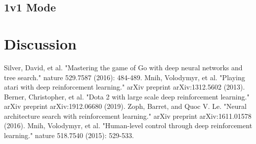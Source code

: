 \documentclass[14pt]{extarticle}
\begin{document}
\subsection{1v1 Mode}



\section{Discussion}




\begin{thebibliography}{99}
	Silver, David, et al. "Mastering the game of Go with deep neural networks and tree search." nature 529.7587 (2016): 484-489.
	Mnih, Volodymyr, et al. "Playing atari with deep reinforcement learning." arXiv preprint arXiv:1312.5602 (2013).
	Berner, Christopher, et al. "Dota 2 with large scale deep reinforcement learning." arXiv preprint arXiv:1912.06680 (2019).
    Zoph, Barret, and Quoc V. Le. "Neural architecture search with reinforcement learning." arXiv preprint arXiv:1611.01578 (2016).
    Mnih, Volodymyr, et al. "Human-level control through deep reinforcement learning." nature 518.7540 (2015): 529-533.
\end{thebibliography}
\end{document}
